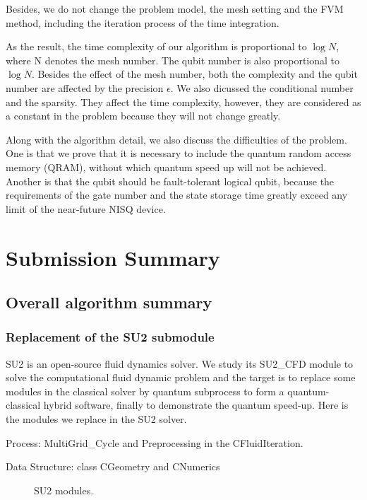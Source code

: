 \documentclass[%
 reprint,
 amsmath,amssymb,
pra,
]{revtex4-1}
\begin{document}
Besides, we do not change the problem model, the mesh setting and the FVM method, including the iteration process of the time integration.

As the result, the time complexity of our algorithm is proportional to $\log⁡ N$, where N denotes the mesh number. The qubit number is also proportional to $\log⁡ N$. Besides the effect of the mesh number, both the complexity and the qubit number are affected by the precision $\epsilon$. We also dicussed the conditional number and the sparsity. They affect the time complexity, however, they are considered as a constant in the problem because they will not change greatly.

Along with the algorithm detail, we also discuss the difficulties of the problem. One is that we prove that it is necessary to include the quantum random access memory (QRAM), without which quantum speed up will not be achieved. Another is that the qubit should be fault-tolerant logical qubit, because the requirements of the gate number and the state storage time greatly exceed any limit of the near-future NISQ device.

\section{Submission Summary}

\subsection{Overall algorithm summary}

\subsubsection{Replacement of the SU2 submodule} 

SU2 is an open-source fluid dynamics solver. We study its SU2\_CFD module to solve the computational fluid dynamic problem and the target is to replace some modules in the classical solver by quantum subprocess to form a quantum-classical hybrid software, finally to demonstrate the quantum speed-up. Here is the modules we replace in the SU2 solver.

Process: MultiGrid_Cycle and Preprocessing in the CFluidIteration.

Data Structure: class CGeometry and CNumerics

\begin{figure}[htbp]
     \caption{SU2 modules.}
    \label{SU2modules}
\end{figure}
\end{document}
